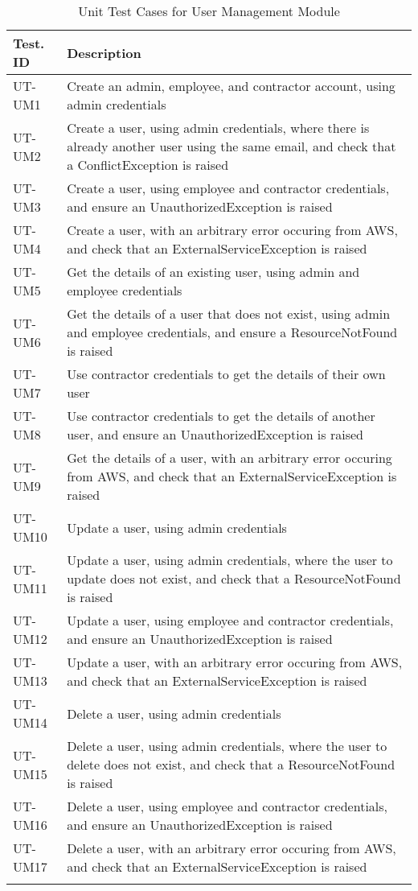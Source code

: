 \documentclass[12pt, titlepage]{article}
\begin{document}
\begin{longtable}{|m{2cm}|m{10cm}|}
  \hline
  \textbf{Test. ID} & \textbf{Description}\\ \hline
  UT-UM1 & Create an admin, employee, and contractor account, using
  admin credentials\\ \hline
  UT-UM2 & Create a user, using admin credentials, where there is
  already another user using the same email, and check that a
  ConflictException is raised\\ \hline
  UT-UM3 & Create a user, using employee and contractor credentials,
  and ensure an UnauthorizedException is raised\\ \hline
  UT-UM4 & Create a user, with an arbitrary error occuring from AWS,
  and check that an ExternalServiceException is raised\\ \hline
  UT-UM5 & Get the details of an existing user, using admin and
  employee credentials\\ \hline
  UT-UM6 & Get the details of a user that does not exist, using
  admin and employee credentials, and ensure a ResourceNotFound is
  raised\\ \hline
  UT-UM7 & Use contractor credentials to get the details of their
  own user\\ \hline
  UT-UM8 & Use contractor credentials to get the details of another
  user, and ensure an UnauthorizedException is raised\\ \hline
  UT-UM9 & Get the details of a user, with an arbitrary error
  occuring from AWS, and check that an ExternalServiceException is
  raised\\ \hline
  UT-UM10 & Update a user, using admin credentials\\ \hline
  UT-UM11 & Update a user, using admin credentials, where the user
  to update does not exist, and check that a ResourceNotFound is
  raised\\ \hline
  UT-UM12 & Update a user, using employee and contractor
  credentials, and ensure an UnauthorizedException is raised\\ \hline
  UT-UM13 & Update a user, with an arbitrary error occuring from
  AWS, and check that an ExternalServiceException is raised\\ \hline
  UT-UM14 & Delete a user, using admin credentials\\ \hline
  UT-UM15 & Delete a user, using admin credentials, where the user
  to delete does not exist, and check that a ResourceNotFound is
  raised\\ \hline
  UT-UM16 & Delete a user, using employee and contractor
  credentials, and ensure an UnauthorizedException is raised\\ \hline
  UT-UM17 & Delete a user, with an arbitrary error occuring from
  AWS, and check that an ExternalServiceException is raised\\ \hline
  \caption{Unit Test Cases for User Management Module}
\end{longtable}
\end{document}
